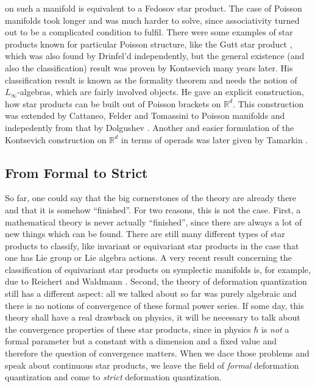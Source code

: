 on such a manifold is equivalent to a Fedosov star product. The case of Poisson 
manifolds took longer and was much harder to solve, since associativity turned 
out to be a complicated condition to fulfil. There were some examples of star 
products known for particular Poisson structure, like the Gutt star product 
\cite{gutt:1983a}, which was also found by Drinfel'd \cite{drinfeld:1983a} 
independently, but the general existence (and also the classification) result was 
proven by Kontsevich \cite{kontsevich:1997:pre, kontsevich:2003a} many years 
later. His classification result is known as the formality theorem and needs the 
notion of $L_{\infty}$-algebras, which are fairly involved objects. He gave an 
explicit construction, how star products can be built out of Poisson brackets on 
$\mathbb{R}^d$. This construction was extended by Cattaneo, Felder and Tomassini 
to Poisson manifolds \cite{cattaneo.felder.tomassini:2002b} and indepedently from 
that by Dolgushev \cite{dolgushev:2005a}. Another and easier formulation of the 
Kontsevich construction on $\mathbb{R}^d$ in terms of operads was later given by 
Tamarkin \cite{tamarkin:2003a}.



\subsection{From Formal to Strict}
\label{subsec:chap2_Formal2Strict}

So far, one could say that the big cornerstones of the theory are already there 
and that it is somehow ``finished''. For two reasons, this is not the case. 
First, a mathematical theory is never actually ``finished'', since there are 
always a lot of new things which can be found. There are still many different 
types of star products to classify, like invariant or equivariant star products 
in the case that one has Lie group or Lie algebra actions. A very recent result 
concerning the classification of equivariant star products on symplectic 
manifolds is, for example, due to Reichert and Waldmann 
\cite{reichert.waldmann:2015a:pre}. Second, the theory of deformation 
quantization still has a different aspect: all we talked about so far was purely 
algebraic and there is no notions of convergence of these formal power series. 
If some day, this theory shall have a real drawback on physics, it will be 
necessary to talk about the convergence properties of these star products, since 
in physics $\hbar$ is \emph{not} a formal parameter but a constant with a 
dimension and a fixed value and therefore the question of convergence matters. 
When we dace those problems and speak about continuous star products, we leave the 
field of \emph{formal} deformation quantization and come to \emph{strict} 
deformation quantization.


